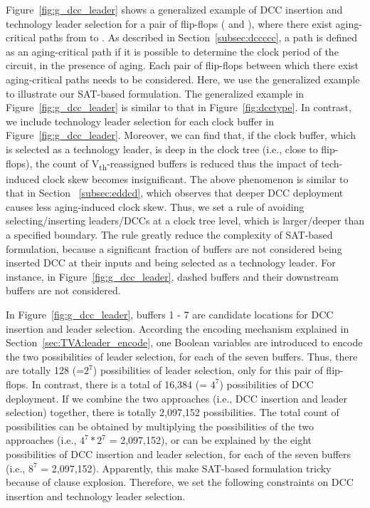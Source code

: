 Figure~\ref{fig:g_dcc_leader} shows a generalized example of DCC insertion and technology leader selection for a pair of flip-flops ( and ), where there exist aging-critical paths from  to . As described in Section~\ref{subsec:dccccc}, a path is defined as an aging-critical path if it is possible to determine the clock period of the circuit, in the presence of aging. Each pair of flip-flops between which there exist aging-critical paths needs to be considered. Here, we use the generalized example to illustrate our SAT-based formulation. The generalized example in Figure~\ref{fig:g_dcc_leader} is similar to that in Figure~\ref{fig:dcctype}. In contrast, we include technology leader selection for each clock buffer in Figure~\ref{fig:g_dcc_leader}. Moreover, we can find that, if the clock buffer, which is selected as a technology leader, is deep in the clock tree (i.e., close to flip-flops), the count of V\textsubscript{th}-reassigned buffers is reduced thus the impact of tech-induced clock skew becomes insignificant. The above phenomenon is similar to that in Section ~\ref{subsec:eddcd}, which observes that deeper DCC deployment causes less aging-induced clock skew. Thus, we set a rule of avoiding selecting/inserting leaders/DCCs at a clock tree level, which is larger/deeper than a specified boundary.  The rule greatly reduce the complexity of SAT-based formulation, because a significant fraction of buffers are not considered being inserted DCC at their inputs and being selected as a technology leader. For instance, in Figure~\ref{fig:g_dcc_leader}, dashed buffers and their downstream buffers are not considered. 

In Figure~\ref{fig:g_dcc_leader}, buffers 1 - 7 are candidate locations for DCC insertion and leader selection. According the encoding mechanism explained in Section~\ref{sec:TVA:leader_encode}, one Boolean variables are introduced to encode the two possibilities of leader selection, for each of the seven buffers. Thus, there are totally 128 (=$2^7$) possibilities of leader selection, only for this pair of flip-flops. In contrast, there is a total of 16,384 (= $4^7$) possibilities of DCC  deployment. If we combine the two approaches (i.e., DCC insertion and leader selection) together, there is totally 2,097,152 possibilities. The total count of possibilities can be obtained by multiplying the possibilities of the two approaches (i.e., $4^7*2^7$ = 2,097,152), or can be explained by the eight possibilities of DCC insertion and leader selection, for each of the seven buffers (i.e., $8^7$ = 2,097,152). Apparently, this make SAT-based formulation tricky because of clause explosion. Therefore, we set the following constraints on DCC insertion and technology leader selection.

